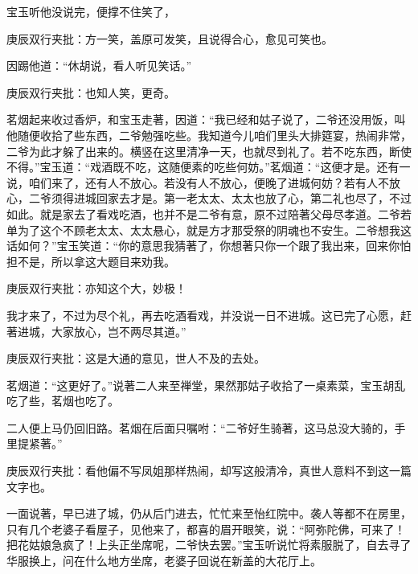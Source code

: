 \begin{parag}
    宝玉听他没说完，便撑不住笑了，\begin{note}庚辰双行夹批：方一笑，盖原可发笑，且说得合心，愈见可笑也。\end{note}因踢他道：“休胡说，看人听见笑话。”\begin{note}庚辰双行夹批：也知人笑，更奇。\end{note}茗烟起来收过香炉，和宝玉走著，因道：“我已经和姑子说了，二爷还没用饭，叫他随便收拾了些东西，二爷勉强吃些。我知道今儿咱们里头大排筵宴，热闹非常，二爷为此才躲了出来的。横竖在这里清净一天，也就尽到礼了。若不吃东西，断使不得。”宝玉道：“戏酒既不吃，这随便素的吃些何妨。”茗烟道：“这便才是。还有一说，咱们来了，还有人不放心。若没有人不放心，便晚了进城何妨？若有人不放心，二爷须得进城回家去才是。第一老太太、太太也放了心，第二礼也尽了，不过如此。就是家去了看戏吃酒，也并不是二爷有意，原不过陪著父母尽孝道。二爷若单为了这个不顾老太太、太太悬心，就是方才那受祭的阴魂也不安生。二爷想我这话如何？”宝玉笑道：“你的意思我猜著了，你想著只你一个跟了我出来，回来你怕担不是，所以拿这大题目来劝我。\begin{note}庚辰双行夹批：亦知这个大，妙极！\end{note}我才来了，不过为尽个礼，再去吃酒看戏，并没说一日不进城。这已完了心愿，赶著进城，大家放心，岂不两尽其道。”\begin{note}庚辰双行夹批：这是大通的意见，世人不及的去处。\end{note}茗烟道：“这更好了。”说著二人来至禅堂，果然那姑子收拾了一桌素菜，宝玉胡乱吃了些，茗烟也吃了。
\end{parag}


\begin{parag}
    二人便上马仍回旧路。茗烟在后面只嘱咐：“二爷好生骑著，这马总没大骑的，手里提紧著。”\begin{note}庚辰双行夹批：看他偏不写凤姐那样热闹，却写这般清冷，真世人意料不到这一篇文字也。\end{note}一面说著，早已进了城，仍从后门进去，忙忙来至怡红院中。袭人等都不在房里，只有几个老婆子看屋子，见他来了，都喜的眉开眼笑，说：“阿弥陀佛，可来了！把花姑娘急疯了！上头正坐席呢，二爷快去罢。”宝玉听说忙将素服脱了，自去寻了华服换上，问在什么地方坐席，老婆子回说在新盖的大花厅上。
\end{parag}



